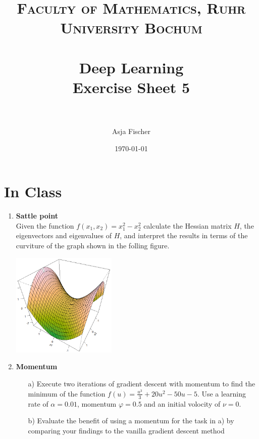 \documentclass[paper=a4, fontsize=11pt]{scrartcl} %
\title{	
\normalfont \normalsize 
\textsc{Faculty of Mathematics, Ruhr University Bochum} \\ [25pt] %
\horrule{0.5pt} \\[0.4cm] %
\huge Deep Learning\\{\Large Exercise Sheet 5}\\ %
\horrule{2pt} \\[0.5cm] %
}
\author{Asja Fischer} %
\date{\normalsize\today} %
\numberwithin{equation}{section} %
\numberwithin{figure}{section} %
\numberwithin{table}{section} %
\begin{document}
\maketitle %
\section{In Class}
\begin{enumerate} 


\item \textbf{Sattle point}\\
Given the function $f(x_1,x_2)= x_1^2 - x_2^2$ calculate the Hessian matrix $H$, the eigenvectors and eigenvalues of $H$, and interpret the results in terms of the curviture of the graph shown in the folling figure. 

\begin{center}
\includegraphics[width=5cm]{images/saddlepoint.png}
\end{center}

\item \textbf{Momentum}
\begin{itemize}
\item[a)] Execute two iterations of gradient descent with momentum to find the minimum of the function $f(u)=\frac{u^3}{3}+20 u^2-50 u-5$.
Use a learning rate of $\alpha=0.01$, momentum $\varphi=0.5$ and an initial volocity of $\nu=0$.
\item[b)] Evaluate the benefit of using a momentum for the task in a) by comparing your findings to the vanilla gradient descent method
\end{itemize}


\end{enumerate}
\end{document}
